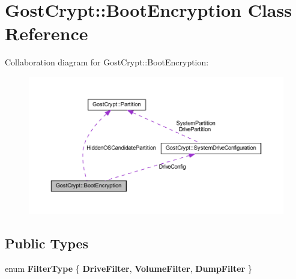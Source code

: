 \hypertarget{class_gost_crypt_1_1_boot_encryption}{}\section{Gost\+Crypt\+:\+:Boot\+Encryption Class Reference}
\label{class_gost_crypt_1_1_boot_encryption}


Collaboration diagram for Gost\+Crypt\+:\+:Boot\+Encryption\+:
\nopagebreak
\begin{figure}[H]
\begin{center}
\leavevmode
\includegraphics[width=350pt]{class_gost_crypt_1_1_boot_encryption__coll__graph}
\end{center}
\end{figure}
\subsection*{Public Types}
\begin{DoxyCompactItemize}
\item 
\mbox{\label{class_gost_crypt_1_1_boot_encryption_acbc337705c6e849974edc1db0006043c}} 
enum {\bfseries Filter\+Type} \{ {\bfseries Drive\+Filter}, 
{\bfseries Volume\+Filter}, 
{\bfseries Dump\+Filter}
 \}
\end{DoxyCompactItemize}
